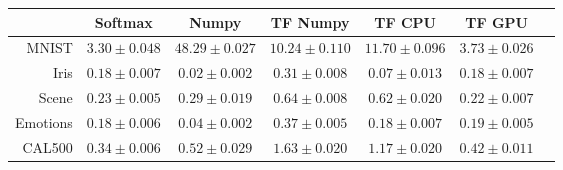 \begin{tabular}{r|cccccc}
& Softmax & Numpy & TF Numpy & TF CPU & TF GPU \\
\hline
MNIST & $3.30 \pm 0.048$ & $48.29 \pm 0.027$ & $10.24 \pm 0.110$ & $11.70 \pm 0.096$ & $3.73 \pm 0.026$ \\
Iris & $0.18 \pm 0.007$ & $0.02 \pm 0.002$ & $0.31 \pm 0.008$ & $0.07 \pm 0.013$ & $0.18 \pm 0.007$ \\
Scene & $0.23 \pm 0.005$ & $0.29 \pm 0.019$ & $0.64 \pm 0.008$ & $0.62 \pm 0.020$ & $0.22 \pm 0.007$ \\
Emotions & $0.18 \pm 0.006$ & $0.04 \pm 0.002$ & $0.37 \pm 0.005$ & $0.18 \pm 0.007$ & $0.19 \pm 0.005$ \\
CAL500 & $0.34 \pm 0.006$ & $0.52 \pm 0.029$ & $1.63 \pm 0.020$ & $1.17 \pm 0.020$ & $0.42 \pm 0.011$ \\
\end{tabular}

